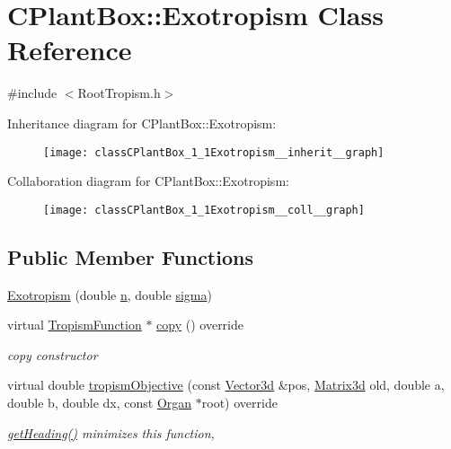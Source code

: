 \hypertarget{classCPlantBox_1_1Exotropism}{}\section{C\+Plant\+Box\+:\+:Exotropism Class Reference}
\label{classCPlantBox_1_1Exotropism}


{\ttfamily \#include $<$Root\+Tropism.\+h$>$}



Inheritance diagram for C\+Plant\+Box\+:\+:Exotropism\+:\nopagebreak
\begin{figure}[H]
\begin{center}
\leavevmode
\texttt{[image: classCPlantBox\_1\_1Exotropism\_\_inherit\_\_graph]}
\end{center}
\end{figure}


Collaboration diagram for C\+Plant\+Box\+:\+:Exotropism\+:\nopagebreak
\begin{figure}[H]
\begin{center}
\leavevmode
\texttt{[image: classCPlantBox\_1\_1Exotropism\_\_coll\_\_graph]}
\end{center}
\end{figure}
\subsection*{Public Member Functions}
\begin{DoxyCompactItemize}
\item 
\hyperlink{classCPlantBox_1_1Exotropism_af2dd84113a9f66b735f5df62e658f01b}{Exotropism} (double \hyperlink{classCPlantBox_1_1TropismFunction_a619c74d63319c406730c95679784a04a}{n}, double \hyperlink{classCPlantBox_1_1TropismFunction_acdc5f9c3beda0a74ddadd591c5d8afaf}{sigma})
\item 
\mbox{\label{classCPlantBox_1_1Exotropism_a69d3e10cbbb4eb1bd4f31f734a030950}} 
virtual \hyperlink{classCPlantBox_1_1TropismFunction}{Tropism\+Function} $\ast$ \hyperlink{classCPlantBox_1_1Exotropism_a69d3e10cbbb4eb1bd4f31f734a030950}{copy} () override
\begin{DoxyCompactList}\small\item\em copy constructor \end{DoxyCompactList}\item 
virtual double \hyperlink{classCPlantBox_1_1Exotropism_a2049c4f5a375d90c05e9995df2e01542}{tropism\+Objective} (const \hyperlink{classCPlantBox_1_1Vector3d}{Vector3d} \&pos, \hyperlink{classCPlantBox_1_1Matrix3d}{Matrix3d} old, double a, double b, double dx, const \hyperlink{classCPlantBox_1_1Organ}{Organ} $\ast$root) override
\begin{DoxyCompactList}\small\item\em \hyperlink{classCPlantBox_1_1TropismFunction_adb52b88734a94fe1365a00e02c7e6be5}{get\+Heading()} minimizes this function, \end{DoxyCompactList}\end{DoxyCompactItemize}
